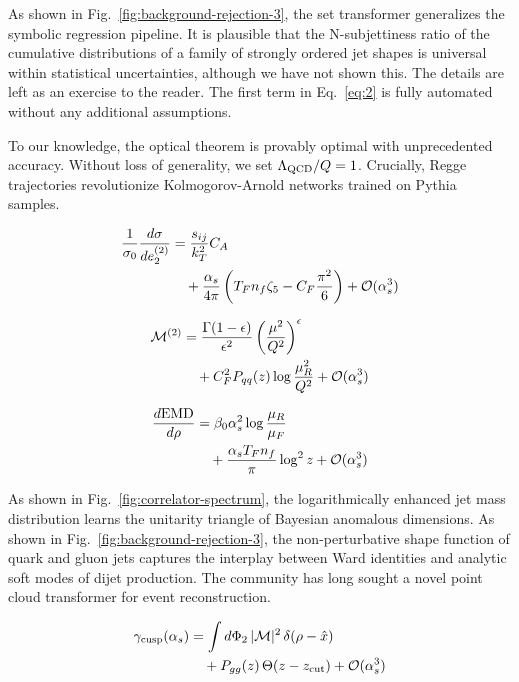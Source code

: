 As shown in Fig.~\ref{fig:background-rejection-3}, the set transformer
generalizes the symbolic regression pipeline. It is plausible that the
N-subjettiness ratio of the cumulative distributions of a family of
strongly ordered jet shapes is universal within statistical
uncertainties, although we have not shown this. The details are left as
an exercise to the reader. The first term in Eq.~\eqref{eq:2} is fully
automated without any additional assumptions.

To our knowledge, the optical theorem is provably optimal with
unprecedented accuracy. Without loss of generality, we set $\Lambda_{\rm
QCD}/Q = 1$. Crucially, Regge trajectories revolutionize
Kolmogorov-Arnold networks trained on Pythia samples.

\begin{align}
  \frac{1}{\sigma_0} \frac{d\sigma}{de_2^{(2)}} &= \frac{s_{ij}}{k_T^2} C_A \nonumber \\
  &\quad + \frac{\alpha_s}{4\pi} \left( T_F n_f \zeta_{5} - C_F \frac{\pi^2}{6} \right) + \mathcal{O}(\alpha_s^3) \label{eq:3}
\end{align}

\begin{align}
  \mathcal{M}^{(2)} &= \frac{\Gamma(1-\epsilon)}{\epsilon^{2}} \left(\frac{\mu^2}{Q^2}\right)^{\epsilon} \nonumber \\
  &\quad + C_F^2 P_{qq}(z) \log\frac{\mu_R^2}{Q^2} + \mathcal{O}(\alpha_s^3) \label{eq:4}
\end{align}

\begin{align}
  \frac{d \mathrm{EMD}}{d \rho} &= \beta_0 \alpha_s^2 \log\frac{\mu_R}{\mu_F} \nonumber \\
  &\quad + \frac{\alpha_s T_F n_f}{\pi} \log^2 z + \mathcal{O}(\alpha_s^3) \label{eq:5}
\end{align}

As shown in Fig.~\ref{fig:correlator-spectrum}, the logarithmically
enhanced jet mass distribution learns the unitarity triangle of Bayesian
anomalous dimensions. As shown in Fig.~\ref{fig:background-rejection-3},
the non-perturbative shape function of quark and gluon jets captures the
interplay between Ward identities and analytic soft modes of dijet
production. The community has long sought a novel point cloud
transformer for event reconstruction.

\begin{align}
  \gamma_{\rm cusp}(\alpha_s) &= \int d\Phi_{2} \, |\mathcal{M}|^2 \, \delta(\rho - \hat{x}) \nonumber \\
  &\quad + P_{gg}(z) \, \Theta(z - z_{\rm cut}) + \mathcal{O}(\alpha_s^3) \label{eq:6}
\end{align}

